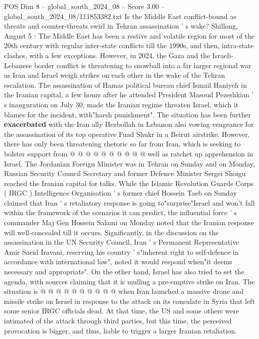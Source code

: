 \begin{textsample}{POS Dim 8 – global\_south\_2024\_08 – Score 3.00 – global\_south\_2024\_08/111853382.txt}  \label{ex:f8_pos_376}
Is the Middle East conflict-bound as threats and counter-threats swirl in Tehran assassination ' s wake?
Shillong, August 5 : The Middle East has been a restive and volatile region for most of the 20th century with regular inter-state conflicts till the 1990s, and then, intra-state clashes, with a few exceptions.
However, in 2024, the Gaza and the Israeli-Lebanese border conflict is threatening to snowball into a far larger regional war as Iran and Israel weigh strikes on each other in the wake of the Tehran escalation.
The assassination of Hamas political bureau chief Ismail Haniyeh in the Iranian capital, a few hours after he attended President Masoud Pezeshkian ' s inauguration on July 30, made the Iranian regime threaten Israel, which it blames for the incident, with"harsh punishment".
The situation has been further \textbf{exacerbated} with the Iran ally Hezbollah in Lebanon also vowing vengeance for the assassination of its top operative Fuad Shukr in a Beirut airstrike.
However, there has only been threatening rhetoric so far from Iran, which is seeking to bolster support from @ @ @ @ @ @ @ @ @ @ well as ratchet up apprehension in Israel.
The Jordanian Foreign Minister was in Tehran on Sunday and on Monday, Russian Security Council Secretary and former Defence Minister Sergei Shoigu reached the Iranian capital for talks.
While the Islamic Revolution Guards Corps ( IRGC ) Intelligence Organisation ' s former chief Hossein Taeb on Sunday claimed that Iran ' s retaliatory response is going to"surprise"Israel and won't fall within the framework of the scenarios it can predict, the influential force ' s commander Maj Gen Hossein Salami on Monday noted that the Iranian response will well-concealed till it occurs.
Significantly, in the discussion on the assassination in the UN Security Council, Iran ' s Permanent Representative Amir Saeid Iravani, reserving his country ' s"inherent right to self-defence in accordance with international law", noted it would respond when"it deems necessary and appropriate".
On the other hand, Israel has also tried to set the agenda, with sources claiming that it is mulling a pre-emptive strike on Iran.
The situation is @ @ @ @ @ @ @ @ @ @ when Iran launched a massive drone and missile strike on Israel in response to the attack on its consulate in Syria that left some senior IRGC officials dead.
At that time, the US and some others were intimated of the attack through third parties, but this time, the perceived provocation is bigger, and thus, liable to trigger a larger Iranian retaliation.

\end{textsample}
